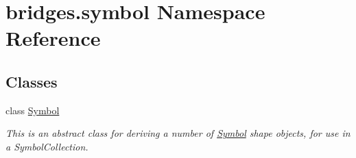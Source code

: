 \hypertarget{namespacebridges_1_1symbol}{}\section{bridges.\+symbol Namespace Reference}
\label{namespacebridges_1_1symbol}
\subsection*{Classes}
\begin{DoxyCompactItemize}
\item 
class \hyperlink{classbridges_1_1symbol_1_1_symbol}{Symbol}
\begin{DoxyCompactList}\small\item\em This is an abstract class for deriving a number of \hyperlink{classbridges_1_1symbol_1_1_symbol}{Symbol} shape objects, for use in a Symbol\+Collection. \end{DoxyCompactList}\end{DoxyCompactItemize}
